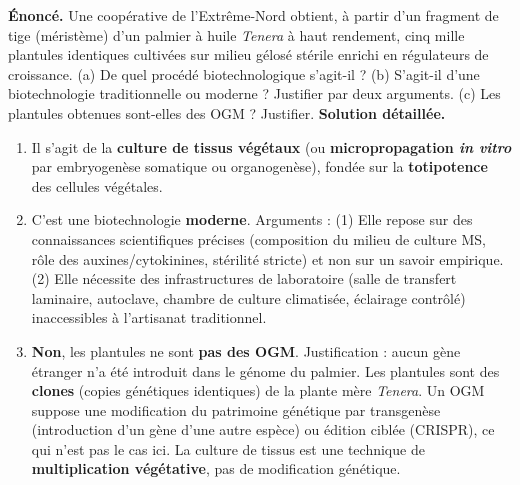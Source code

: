 \documentclass[11pt]{article}
\begin{document}
\begin{exoresolu}
\textbf{Énoncé.} Une coopérative de l'Extrême-Nord obtient, à partir d'un fragment de tige (méristème) d'un palmier à huile \emph{Tenera} à haut rendement, cinq mille plantules identiques cultivées sur milieu gélosé stérile enrichi en régulateurs de croissance. (a) De quel procédé biotechnologique s'agit-il ? (b) S'agit-il d'une biotechnologie traditionnelle ou moderne ? Justifier par deux arguments. (c) Les plantules obtenues sont-elles des OGM ? Justifier.
\tcblower
\textbf{Solution détaillée.}
\begin{enumerate}
\item[(a)] Il s'agit de la \textbf{culture de tissus végétaux} (ou \textbf{micropropagation \emph{in vitro}} par embryogenèse somatique ou organogenèse), fondée sur la \textbf{totipotence} des cellules végétales.
\item[(b)] C'est une biotechnologie \textbf{moderne}. Arguments : (1) Elle repose sur des connaissances scientifiques précises (composition du milieu de culture MS, rôle des auxines/cytokinines, stérilité stricte) et non sur un savoir empirique. (2) Elle nécessite des infrastructures de laboratoire (salle de transfert laminaire, autoclave, chambre de culture climatisée, éclairage contrôlé) inaccessibles à l'artisanat traditionnel.
\item[(c)] \textbf{Non}, les plantules ne sont \textbf{pas des OGM}. Justification : aucun gène étranger n'a été introduit dans le génome du palmier. Les plantules sont des \textbf{clones} (copies génétiques identiques) de la plante mère \emph{Tenera}. Un OGM suppose une modification du patrimoine génétique par transgenèse (introduction d'un gène d'une autre espèce) ou édition ciblée (CRISPR), ce qui n'est pas le cas ici. La culture de tissus est une technique de \textbf{multiplication végétative}, pas de modification génétique.
\end{enumerate}
\end{exoresolu}
\end{document}
